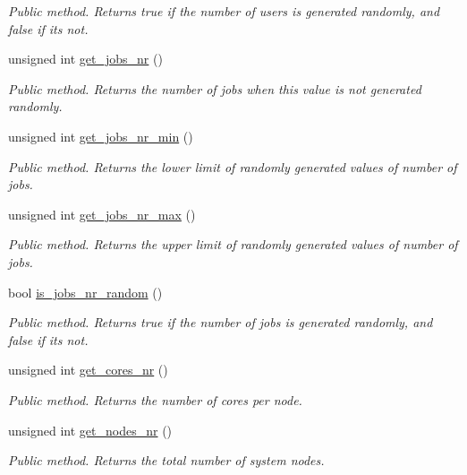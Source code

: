 \begin{DoxyCompactItemize}
\begin{DoxyCompactList}\small\item\em Public method. Returns true if the number of users is generated randomly, and false if it\textquotesingle{}s not. \end{DoxyCompactList}\item 
unsigned int \hyperlink{classConfiguration_a09d80d794d6614c7bcbdf12b49835f02}{get\+\_\+jobs\+\_\+nr} ()
\begin{DoxyCompactList}\small\item\em Public method. Returns the number of jobs when this value is not generated randomly. \end{DoxyCompactList}\item 
unsigned int \hyperlink{classConfiguration_a3d224269091e27f9595485ec5d4b0467}{get\+\_\+jobs\+\_\+nr\+\_\+min} ()
\begin{DoxyCompactList}\small\item\em Public method. Returns the lower limit of randomly generated values of number of jobs. \end{DoxyCompactList}\item 
unsigned int \hyperlink{classConfiguration_a19e2080f751736cf98017f6e40533629}{get\+\_\+jobs\+\_\+nr\+\_\+max} ()
\begin{DoxyCompactList}\small\item\em Public method. Returns the upper limit of randomly generated values of number of jobs. \end{DoxyCompactList}\item 
bool \hyperlink{classConfiguration_ae35b4429de406ed81c1be1ae54bfc3d7}{is\+\_\+jobs\+\_\+nr\+\_\+random} ()
\begin{DoxyCompactList}\small\item\em Public method. Returns true if the number of jobs is generated randomly, and false if it\textquotesingle{}s not. \end{DoxyCompactList}\item 
unsigned int \hyperlink{classConfiguration_a3255f4b61deb08b21a39251b9dc4d2b4}{get\+\_\+cores\+\_\+nr} ()
\begin{DoxyCompactList}\small\item\em Public method. Returns the number of cores per node. \end{DoxyCompactList}\item 
unsigned int \hyperlink{classConfiguration_aafbd7647fdc9447cf882083a0be02263}{get\+\_\+nodes\+\_\+nr} ()
\begin{DoxyCompactList}\small\item\em Public method. Returns the total number of system nodes. \end{DoxyCompactList}\item 

\end{DoxyCompactItemize}
